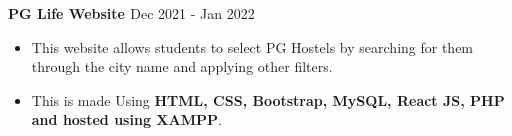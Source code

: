 \textbf{{PG Life Website \href{https://github.com/priyansh17/PGLife-Webdev-Project} {\faExternalLinkSquare}}} \hfill {\faCalendar} Dec 2021 - Jan 2022 \par
\begin{itemize}
	\item This website allows students to select PG Hostels by searching for them through the city name and applying other filters. 
	\item This is made Using \textbf{HTML, CSS, Bootstrap, MySQL, React JS, PHP and hosted using XAMPP}. 
\end{itemize}\vspace{0.1cm} \par
